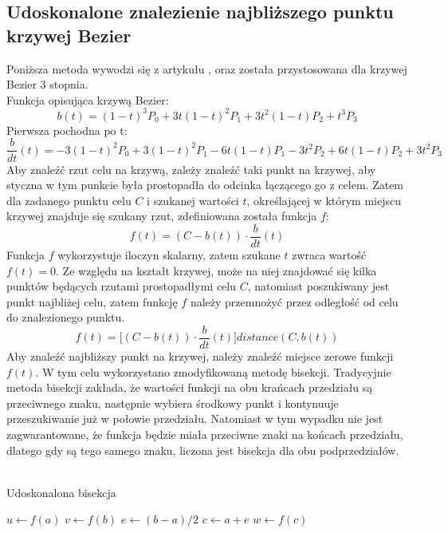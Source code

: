 \subsection{Udoskonalone znalezienie najbliższego punktu krzywej Bezier}
Poniższa metoda wywodzi się z artykułu \cite{ImprovedPointProjectionBezier}, oraz została przystosowana dla krzywej Bezier 3 stopnia.\\
Funkcja opisująca krzywą Bezier:
\[ b(t) = (1 - t)^3 P_0 + 3t(1-t)^2 P_1 + 3t^2 (1-t) P_2 + t^3 P_3 \]
Pierwsza pochodna po t:
\[ \frac{b}{dt}(t) = -3 (1 - t)^2 P_0 + 3 (1-t)^2 P_1 - 6 t (1-t) P_1 - 3t^2 P_2 + 6 t (1-t) P_2 + 3t^2 P_3 \]
Aby znaleźć rzut celu na krzywą, zależy znaleźć taki punkt na krzywej, aby styczna w tym punkcie była prostopadła do odcinka łączącego go z celem. Zatem dla zadanego punktu celu $C$ i szukanej wartości $t$, określającej w którym miejscu krzywej znajduje się szukany rzut, zdefiniowana została funkcja $f$:
\[ f(t) = (C - b(t)) \cdot \frac{b}{dt}(t) \]
Funkcja $f$ wykorzystuje iloczyn skalarny, zatem szukane $t$ zwraca wartość $f(t) = 0$. Ze względu na kształt krzywej, może na niej znajdować się kilka punktów będących rzutami prostopadłymi celu $C$, natomiast poszukiwany jest punkt najbliżej celu, zatem funkcję $f$ należy przemnożyć przez odległość od celu do znalezionego punktu.
\[ f(t) = \big[ (C - b(t)) \cdot \frac{b}{dt}(t) \big] distance(C, b(t)) \]
Aby znaleźć najbliższy punkt na krzywej, należy znaleźć miejsce zerowe funkcji $f(t)$. W tym celu wykorzystano zmodyfikowaną metodę bisekcji. Tradycyjnie metoda bisekcji zakłada, że wartości funkcji na obu krańcach przedziału są przeciwnego znaku, następnie wybiera środkowy punkt i kontynuuje przeszukiwanie już w połowie przedziału. Natomiast w tym wypadku nie jest zagwarantowane, że funkcja będzie miała przeciwne znaki na końcach przedziału, dlatego gdy są tego samego znaku, liczona jest bisekcja dla obu podprzedziałów.
\\\\
\begin{algorithm}[H]
    \caption{Udoskonalona bisekcja}\label{alg}
    $u \gets f(a)$\;
    $v \gets f(b)$\;
    $e \gets (b-a)/2$\;
    $c \gets a+e$\;
    $w \gets f(c)$\;
\end{algorithm}
\phantom{.}\\

